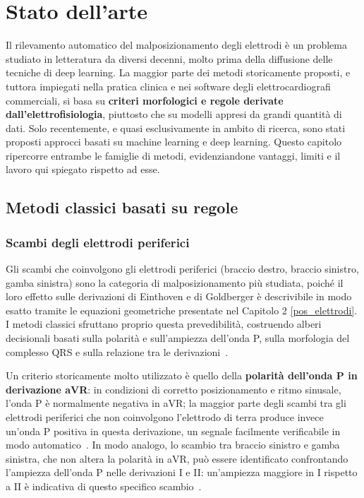 \chapter{Stato dell'arte}

Il rilevamento automatico del malposizionamento degli elettrodi è un problema studiato in letteratura da diversi decenni, molto prima della diffusione delle tecniche di deep learning. La maggior parte dei metodi storicamente proposti, e tuttora impiegati nella pratica clinica e nei software degli elettrocardiografi commerciali, si basa su \textbf{criteri morfologici e regole derivate dall'elettrofisiologia}, piuttosto che su modelli appresi da grandi quantità di dati. Solo recentemente, e quasi esclusivamente in ambito di ricerca, sono stati proposti approcci basati su machine learning e deep learning. Questo capitolo ripercorre entrambe le famiglie di metodi, evidenziandone vantaggi, limiti e il lavoro qui spiegato rispetto ad esse.

\section{Metodi classici basati su regole}

\subsection{Scambi degli elettrodi periferici}

Gli scambi che coinvolgono gli elettrodi periferici (braccio destro, braccio sinistro, gamba sinistra) sono la categoria di malposizionamento più studiata, poiché il loro effetto sulle derivazioni di Einthoven e di Goldberger è descrivibile in modo esatto tramite le equazioni geometriche presentate nel Capitolo 2 \ref{pos_elettrodi}. I metodi classici sfruttano proprio questa prevedibilità, costruendo alberi decisionali basati sulla polarità e sull'ampiezza dell'onda P, sulla morfologia del complesso QRS e sulla relazione tra le derivazioni~\cite{paul2023lead}.

Un criterio storicamente molto utilizzato è quello della \textbf{polarità dell'onda P in derivazione aVR}: in condizioni di corretto posizionamento e ritmo sinusale, l'onda P è normalmente negativa in aVR; la maggior parte degli scambi tra gli elettrodi periferici che non coinvolgono l'elettrodo di terra produce invece un'onda P positiva in questa derivazione, un segnale facilmente verificabile in modo automatico~\cite{paul2023lead}. In modo analogo, lo scambio tra braccio sinistro e gamba sinistra, che non altera la polarità in aVR, può essere identificato confrontando l'ampiezza dell'onda P nelle derivazioni I e II: un'ampiezza maggiore in I rispetto a II è indicativa di questo specifico scambio~\cite{paul2023lead}.


